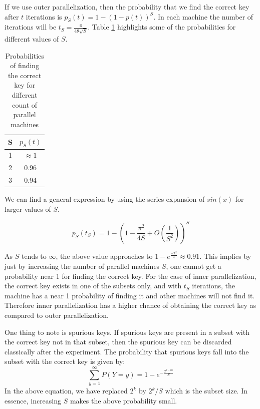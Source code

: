\documentclass[preprint]{transcrypto}
\begin{document}
If we use outer parallelization, then the probability that we find the correct key after $t$ iterations is $p_S(t) = 1 - (1-p(t))^S$. In each machine the number of iterations will be $t_S = \frac{\pi}{4\theta\sqrt{S}}$. Table \ref{tab:pval} highlights some of the probabilities for different values of $S$.


\begin{center}
\begin{table}[h!]
    \centering
    \begin{tabular}{ |c|c| } 
     \hline
     S & $p_S(t)$ \\ \hline
     1 & $\approx 1$ \\ \hline
     2 & 0.96 \\ \hline
     3 & 0.94 \\ \hline
    \end{tabular}
    \caption{Probabilities of finding the correct key for different count of parallel machines }
    \label{tab:pval}
\end{table}
\end{center}

We can find a general expression by using the series expansion of $sin(x)$ for larger values of $S$.

\begin{equation*}
    p_S(t_S) = 1 - \left( 1 - \frac{\pi^2}{4S} + O\left(\frac{1}{S^2}\right) \right)^S 
\end{equation*}

As $S$ tends to $\infty$, the above value approaches to $1 - e^{\frac{-\pi^2}{4}} \approx 0.91$. This implies by just by increasing the number of parallel machines $S$, one cannot get a probability near 1 for finding the correct key. For the case of inner parallelization, the correct key exists in one of the subsets only, and with $t_S$ iterations, the machine has a near 1 probability of finding it and other machines will not find it. Therefore inner parallelization has a higher chance of obtaining the correct key as compared to outer parallelization.

One thing to note is spurious keys. If spurious keys are present in a subset with the correct key not in that subset, then the spurious key can be discarded classically after the experiment. The probability that spurious keys fall into the subset with the correct key is given by:
\begin{equation*}
    \sum_{y = 1}^\infty P(Y = y) = 1 - e^{-\frac{2^{k-rn}}{S}} 
\end{equation*}
In the above equation, we have replaced $2^k$ by $2^k/S$ which is the subset size. In essence, increasing $S$ makes the above probability small. 
\end{document}
